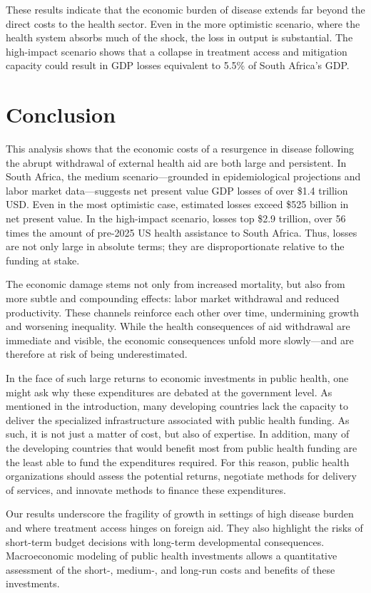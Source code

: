 \documentclass[letterpaper,12pt]{article}
\theoremstyle{definition}
\begin{document}
\begin{spacing}{1.5}
These results indicate that the economic burden of disease extends far beyond the direct costs to the health sector. Even in the more optimistic scenario, where the health system absorbs much of the shock, the loss in output is substantial. The high-impact scenario shows that a collapse in treatment access and mitigation capacity could result in GDP losses equivalent to 5.5\% of South Africa's GDP.



\section{Conclusion}\label{SecConc}

This analysis shows that the economic costs of a resurgence in disease following the abrupt withdrawal of external health aid are both large and persistent. In South Africa, the medium scenario---grounded in epidemiological projections and labor market data---suggests net present value GDP losses of over \$1.4 trillion USD. Even in the most optimistic case, estimated losses exceed \$525 billion in net present value. In the high-impact scenario, losses top \$2.9 trillion, over 56 times the amount of pre-2025 US health assistance to South Africa. Thus, losses are not only large in absolute terms; they are disproportionate relative to the funding at stake.

The economic damage stems not only from increased mortality, but also from more subtle and compounding effects: labor market withdrawal and reduced productivity.  These channels reinforce each other over time, undermining growth and worsening inequality. While the health consequences of aid withdrawal are immediate and visible, the economic consequences unfold more slowly—and are therefore at risk of being underestimated.

In the face of such large returns to economic investments in public health, one might ask why these expenditures are debated at the government level. As mentioned in the introduction, many developing countries lack the capacity to deliver the specialized infrastructure associated with public health funding. As such, it is not just a matter of cost, but also of expertise. In addition, many of the developing countries that would benefit most from public health funding are the least able to fund the expenditures required. For this reason, public health organizations should assess the potential returns, negotiate methods for delivery of services, and innovate methods to finance these expenditures.

Our results underscore the fragility of growth in settings of high disease burden and where treatment access hinges on foreign aid. They also highlight the risks of short-term budget decisions with long-term developmental consequences. Macroeconomic modeling of public health investments allows a quantitative assessment of the short-, medium-, and long-run costs and benefits of these investments.


\end{spacing}
\end{document}
